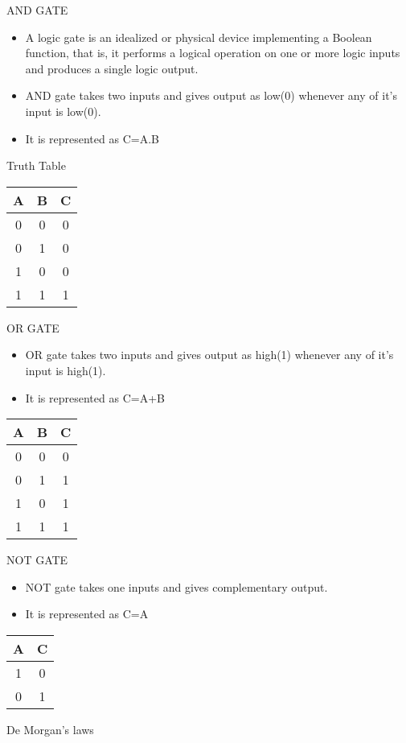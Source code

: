 \documentclass{beamer}
\begin{document}
\begin{frame}{AND GATE}
\begin{block}{}
    \begin{itemize}
	\item A logic gate is an idealized or physical device implementing a Boolean function, that is, it performs a logical operation on one or more logic inputs and produces a single logic output.
	\item AND gate takes two inputs and gives output as low(0) whenever any of it's input is low(0).   
	\item It is represented as \alert{C=A.B} 
    \end{itemize}
  \end{block}
\pause
\begin{block}{Truth Table}
\begin{tabular}{|c|c||c|}
\hline
 \textbf{A} &
\textbf{B} & \textbf{C} \\
\hline
\hline
 0 & 0 & 0 \\
\hline
 0 & 1 & 0 \\
\hline
 1 & 0 & 0 \\
\hline
 1 & 1 & 1 \\
\hline
\end{tabular}
\end{block}
\end{frame}
\begin{frame}{OR GATE}
\begin{itemize}
  \item OR gate takes two inputs and gives output as high(1) whenever any of it's input is high(1).
  \item It is represented as C=A+B
\end{itemize}

\begin{tabular}{|c|c||c|}
\hline
 \textbf{A} &
\textbf{B} & \textbf{C} \\
\hline
\hline
 0 & 0 & 0 \\
\hline
 0 & 1 & 1 \\
\hline
 1 & 0 & 1 \\
\hline
 1 & 1 & 1 \\
\hline
\end{tabular}
\end{frame}
\begin{frame}{NOT GATE}
\begin{itemize}
  \item NOT gate takes one inputs and gives complementary output.
  \item It is represented as C=A
\end{itemize}

\begin{tabular}{|c|c|}
\hline
 \textbf{A} &
\textbf{C} \\
\hline
\hline
 1 & 0 \\
\hline
 0 & 1 \\
\hline
\end{tabular}
\end{frame}
\begin{frame}{De Morgan's laws}
\end{frame}
\end{document}
